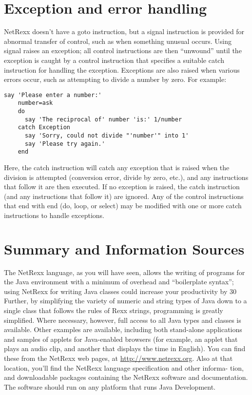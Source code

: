 \section{Exception and error handling}
NetRexx doesn’t have a goto instruction, but a signal instruction is provided for abnormal transfer of control, such as when something unusual occurs. Using signal raises an exception; all control instructions are then “unwound” until the exception is caught by a control instruction that specifies a suitable catch instruction for handling the exception.
Exceptions are also raised when various errors occur, such as
attempting to divide a number by zero. For example:
\begin{lstlisting}[label=exception,caption=Exception]
    say 'Please enter a number:'
    number=ask
    do
      say 'The reciprocal of' number 'is:' 1/number
    catch Exception
      say 'Sorry, could not divide "'number'" into 1'
      say 'Please try again.'
    end
\end{lstlisting}
Here, the catch instruction will catch any exception that is raised when the division is attempted (conversion error, divide by zero, etc.), and any instructions that follow it are then executed. If no exception is raised, the catch instruction (and any instructions that follow it) are ignored.
Any of the control instructions that end with end (do, loop, or select) may be modified with one or more catch instructions to handle exceptions.

\section{Summary and Information Sources}
The NetRexx language, as you will have seen, allows the writing of programs for the Java environment with a minimum of overhead and “boilerplate syntax”; using NetRexx for writing Java classes could increase your productivity by 30%
Further, by simplifying the variety of numeric and string types of Java down to a single class that follows the rules of Rexx strings, programming is greatly simplified. Where necessary, however, full access to all Java types and classes is available.
Other examples are available, including both stand-alone applications and samples of applets for Java-enabled browsers (for example, an applet that plays an audio clip, and another that displays the time in English). You can find these from the NetRexx web pages, at
    \url{http://www.netrexx.org}.
Also at that location, you’ll find the NetRexx language specification and other informa- tion, and downloadable packages containing the NetRexx software and documentation. The software should run on any platform that runs Java Development.